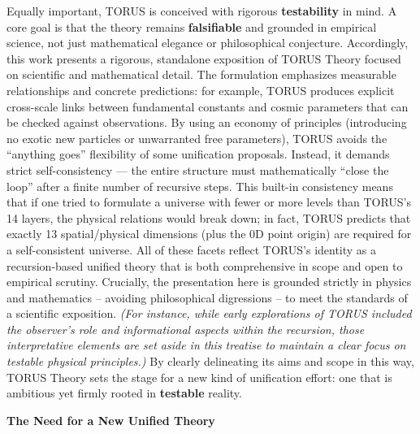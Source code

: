 \documentclass[]{article}
\begin{document}
Equally important, TORUS is conceived with rigorous \textbf{testability}
in mind. A core goal is that the theory remains \textbf{falsifiable} and
grounded in empirical science, not just mathematical elegance or
philosophical conjecture. Accordingly, this work presents a rigorous,
standalone exposition of TORUS Theory focused on scientific and
mathematical detail. The formulation emphasizes measurable relationships
and concrete predictions: for example, TORUS produces explicit
cross-scale links between fundamental constants and cosmic parameters
that can be checked against observations. By using an economy of
principles (introducing no exotic new particles or unwarranted free
parameters), TORUS avoids the ``anything goes'' flexibility of some
unification proposals. Instead, it demands strict self-consistency ---
the entire structure must mathematically ``close the loop'' after a
finite number of recursive steps. This built-in consistency means that
if one tried to formulate a universe with fewer or more levels than
TORUS's 14 layers, the physical relations would break down; in fact,
TORUS predicts that exactly 13 spatial/physical dimensions (plus the 0D
point origin) are required for a self-consistent universe. All of these
facets reflect TORUS's identity as a recursion-based unified theory that
is both comprehensive in scope and open to empirical scrutiny.
Crucially, the presentation here is grounded strictly in physics and
mathematics -- avoiding philosophical digressions -- to meet the
standards of a scientific exposition. \emph{(For instance, while early
explorations of TORUS included the observer's role and informational
aspects within the recursion, those interpretative elements are set
aside in this treatise to maintain a clear focus on testable physical
principles.)} By clearly delineating its aims and scope in this way,
TORUS Theory sets the stage for a new kind of unification effort: one
that is ambitious yet firmly rooted in \textbf{testable} reality.

\textbf{The Need for a New Unified Theory}
\end{document}
